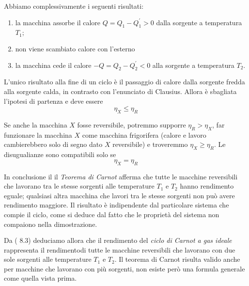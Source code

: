 \documentclass[class=book, crop=false, oneside, 12pt]{standalone}
\begin{document}
Abbiamo complessivamente i seguenti risultati:
\begin{enumerate}
    \item la macchina assorbe il calore \(Q = Q_1 -Q_1^{\prime}> 0\) dalla sorgente a temperatura \(T_1\);
    \item non viene scambiato calore con l'esterno
    \item la macchina cede il calore \(-Q = Q_2 - Q_2^{\prime} < 0 \) alla sorgente a temperatura \(T_2\).
\end{enumerate} 
L'unico risultato alla fine di un ciclo è il passaggio di calore dalla sorgente fredda alla sorgente calda, in contrasto con l'enunciato di Clausius. 
Allora è sbagliata l'ipotesi di partenza e deve essere
\begin{equation}
    \eta_X \leq \eta_R
\end{equation}

Se anche la macchina \(X\) fosse reversibile, potremmo supporre \(\eta_R > \eta_X\), far funzionare la macchina \(X\) come macchina frigorifera (calore e lavoro cambierebbero solo di segno dato \(X\) reversibile)
e troveremmo \(\eta_X \geq \eta_R\).
Le disugualianze sono compatibili solo se
\begin{equation}
    \eta_X = \eta_R
\end{equation}

In conclusione il il \emph{Teorema di Carnot} afferma che tutte le macchine reversibili che lavorano tra le stesse sorgenti alle temperature \(T_1\) e \(T_2\) hanno rendimento eguale; qualsiasi altra macchina che lavori tra le stesse sorgenti non può avere rendimento maggiore. 
Il risultato è indipendente dal particolare sistema che compie il ciclo, come si deduce dal fatto che le proprietà del sistema non compaiono nella dimostrazione.

Da ( 8.3) deduciamo allora che il rendimento del \emph{ciclo di Carnot a gas ideale} rappresenta il rendimentodi tutte le macchine reversibili che lavorano con due sole sorgenti alle temperature \(T_1\) e \(T_2\).
Il teorema di Carnot risulta valido anche per macchine che lavorano con più sorgenti, non esiste però una formula generale come quella vista prima.
\end{document}
